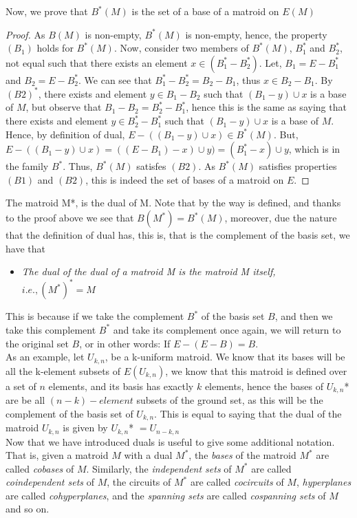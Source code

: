 Now, we prove that $B^*(M)$ is the set of a base of a matroid on $E(M)$
\begin{proof}
    As $B(M)$ is non-empty, $B^*(M)$ is non-empty, hence, the property $(B_1)$ holds for $B^*(M)$. 
    Now, consider two members of $B^*(M)$, $B^*_1$ and $B^*_2$, not equal such that there exists an element $x \in (B^*_1 - B^*_2)$. Let, $B_1 = E - B^*_1$ and $B_2 = E - B^*_2$. We can see that $B^*_1 - B^*_2 = B_2 - B_1$, thus $x \in B_2 - B_1$. By $(B2)^*$, there exists and element $y \in  B_1 - B_2$ such that $(B_1 - y)\cup x$ is a base of $M$, but observe that $B_1 - B_2 = B^*_2 - B^*_1$, hence this is the same as saying that there exists and element $y \in  B^*_2 - B^*_1$ such that $(B_1 - y)\cup x$ is a base of $M$. Hence, by definition of dual, $E-((B_1 - y)\cup x) \in B^*(M)$. But, $E-((B_1 - y)\cup x) = ((E-B_1)-x)\cup y) = (B_1^* - x)\cup y$, which is in the family $B^*$. Thus, $B^*(M)$ satisfes $(B2)$. As $B^*(M)$ satisfies properties $(B1)$ and $(B2)$, this is indeed the set of bases of a matroid on $E$.
\end{proof}

The matroid M*, is the dual of M. Note that by the way is defined, and thanks to the proof above we see that $B(M^*)=B^*(M)$, moreover, due the nature that the definition of dual has, this is, that is the complement of the basis set, we have that
\begin{itemize}
    \item \textit{The dual of the dual of a matroid M is the matroid M itself, $i.e., (M^*)^* = M$}
\end{itemize}
This is because if we take the complement $B^*$ of the basis set $B$, and then we take this complement $B^*$ and take its complement once again, we will return to the original set $B$, or in other words: If $E-(E - B) = B$.\\

As an example, let $U_{k,n}$, be a k-uniform matroid. We know that its bases will be all the k-element subsets of $E(U_{k,n})$, we know that this matroid is defined over a set of $n$ elements, and its basis has exactly $k$ elements, hence the bases of $U_{k,n}$* are be all $(n-k)-element$ subsets of the ground set, as this will be the complement of the basis set of $U_{k,n}$. This is equal to saying that the dual of the matroid $U_{k,n}$ is given by $U_{k,n}$* $= U_{n-k,n}$\\


Now that we have introduced duals is useful to give some additional notation. That is, given a matroid $M$ with a dual $M^*$, the \textit{bases} of the matroid $M^*$ are called \textit{cobases} of $M$. Similarly, the \textit{independent sets} of $M^*$ are called \textit{coindependent sets} of $M$, the circuits of $M^*$ are called \textit{cocircuits} of $M$, \textit{hyperplanes} are called \textit{cohyperplanes}, and the \textit{spanning sets} are called \textit{cospanning sets} of $M$ and so on.\\


